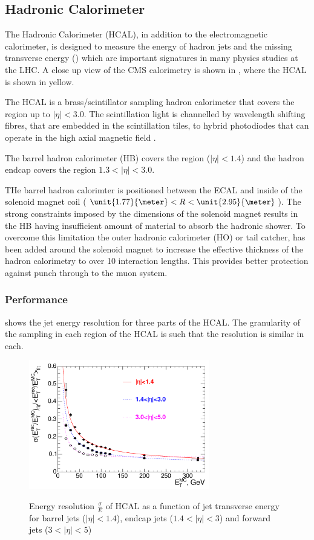 \subsection{Hadronic Calorimeter}

The Hadronic Calorimeter (HCAL), in addition to the electromagnetic calorimeter,
is designed to measure the energy of hadron jets and the missing transverse
energy (\met) which are important signatures in many physics studies at the LHC.
A close up view of the CMS calorimetry is shown in , where the
HCAL is shown in yellow.

The  HCAL is a brass/scintillator
sampling hadron calorimeter that covers the region up to $|\eta|<3.0$.  The
scintillation light is channelled by wavelength shifting fibres, that are
embedded in the scintillation tiles, to hybrid photodiodes that can operate in
the high axial magnetic field \cite{cms}.

The barrel hadron calorimeter (HB) covers the region ($|\eta| < 1.4$)
and the hadron endcap covers the region $1.3 < |\eta| < 3.0$.

THe barrel hadron calorimter is
positioned between the ECAL and inside of the solenoid magnet coil
($\unit{1.77}{\meter}<R<\unit{2.95}{\meter}$).
The strong constraints imposed by the dimensions of the solenoid magnet results
in the HB having insufficient amount of material to absorb the hadronic shower. 
To overcome this limitation the outer hadronic calorimeter (HO) or tail catcher,
has been added around the solenoid magnet to increase the
effective thickness of the hadron calorimetry to over 10 interaction lengths.
This provides better protection against punch through to the muon system.

\subsubsection{Performance}

 shows the jet energy resolution for three parts of
the \ac{HCAL}. The granularity of the sampling in each region of the HCAL is
such that the resolution is similar in each.
\begin{figure}[htbp]
  \centering
  \includegraphics[width=0.7\textwidth]{hcal_performance}
  \label{fig:hcalperform}
  \caption{Energy resolution $\frac{\sigma}{E}$ of HCAL as a function of jet
transverse energy for barrel jets ($|\eta| < 1.4$), endcap jets ($1.4<|\eta| <
3$) and forward jets ($3<|\eta| < 5$) }
\end{figure}

